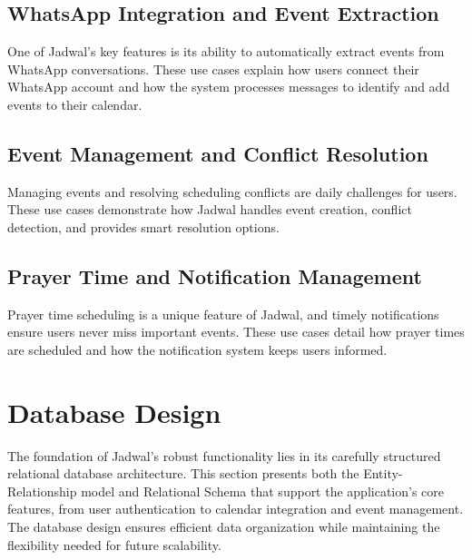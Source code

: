 \documentclass[12pt,a4paper]{report}
\begin{document}
\subsection{WhatsApp Integration and Event Extraction}
One of Jadwal's key features is its ability to automatically extract events from WhatsApp conversations. These use cases explain how users connect their WhatsApp account and how the system processes messages to identify and add events to their calendar.




\subsection{Event Management and Conflict Resolution}
Managing events and resolving scheduling conflicts are daily challenges for users. These use cases demonstrate how Jadwal handles event creation, conflict detection, and provides smart resolution options.





\subsection{Prayer Time and Notification Management}
Prayer time scheduling is a unique feature of Jadwal, and timely notifications ensure users never miss important events. These use cases detail how prayer times are scheduled and how the notification system keeps users informed.









\section{Database Design}

The foundation of Jadwal's robust functionality lies in its carefully structured relational database architecture. This section presents both the Entity-Relationship model and Relational Schema that support the application's core features, from user authentication to calendar integration and event management. The database design ensures efficient data organization while maintaining the flexibility needed for future scalability.
\end{document}
